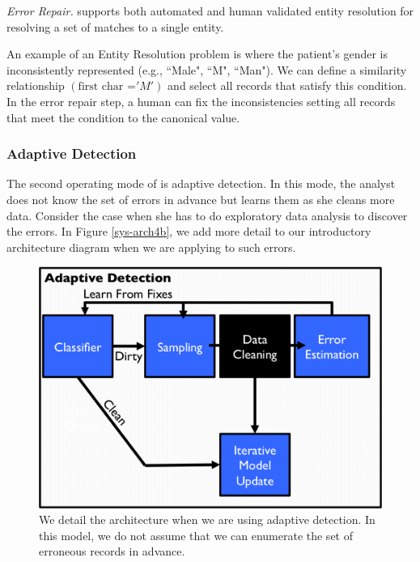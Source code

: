 \vspace{0.5em}

\emph{Error Repair. } \sys supports both automated and human validated entity resolution for resolving a set of matches to a single entity.

\begin{example}
An example of an Entity Resolution problem is where the patient's gender is inconsistently represented (e.g., ``Male", ``M", ``Man"). 
We can define a similarity relationship $(\text{first char =} 'M')$ and select all records that satisfy this condition.
In the error repair step, a human can fix the inconsistencies setting all records that meet the condition to the canonical value.
\end{example}

\subsubsection{Adaptive Detection}
The second operating mode of \sys is adaptive detection.
In this mode, the analyst does not know the set of errors in advance but learns them as she cleans more data.
Consider the case when she has to do exploratory data analysis to discover the errors.
In Figure \ref{sys-arch4b}, we add more detail to our introductory architecture diagram when we are applying \sys to such errors.

\begin{figure}[t]
\centering
 \includegraphics[width=0.6\columnwidth]{figs/arch1b.png}
 \caption{We detail the \sys architecture when we are using adaptive detection. In this model, we do not assume that we can enumerate the set of erroneous records in advance. \label{sys-arch4a}}
\end{figure}

